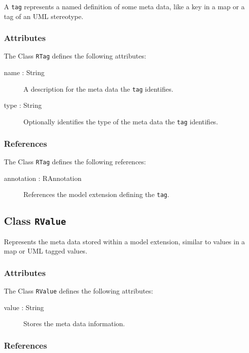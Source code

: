 A \verb|tag| represents a named definition of some meta data, like a key in a map or a tag of an UML stereotype.

\subsubsection{Attributes}

The Class \verb|RTag| defines the following attributes:

\begin{description}
	\item[name : String] A description for the meta data the \verb|tag| identifies.
	\item[type : String] Optionally identifies the type of the meta data the \verb|tag| identifies.
\end{description}
\subsubsection{References}

The Class \verb|RTag| defines the following references:

\begin{description}
	\item[annotation : RAnnotation] References the model extension defining the \verb|tag|.
\end{description}

\subsection{Class {\tt RValue}}

Represents the meta data stored within a model extension, similar to values in a map or UML tagged values.

\subsubsection{Attributes}

The Class \verb|RValue| defines the following attributes:

\begin{description}
	\item[value : String] Stores the meta data information.
\end{description}
\subsubsection{References}

